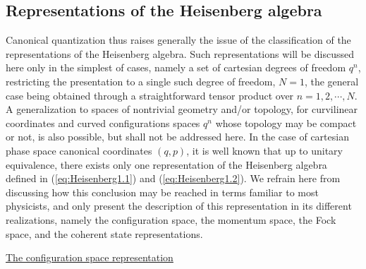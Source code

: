 \documentclass[a4paper,11pt]{article}
\begin{document}
\subsection{Representations of the Heisenberg algebra}
\label{Subsect2.4}

Canonical quantization thus raises generally the issue of the classification
of the representations of the Heisenberg algebra. Such representations
will be discussed here only in the simplest of cases, namely a set
of cartesian degrees of freedom $q^n$, restricting the presentation
to a single such degree of freedom, $N=1$, the general case being obtained
through a straightforward tensor pro\-duct over $n=1,2,\cdots,N$. 
A generalization to spaces of nontrivial geometry and/or topology,
for curvilinear coordinates and curved configurations spaces $q^n$ whose 
topology may be compact or not, is also possible, but shall not be addressed 
here.\cite{JG2,JG2bis} In the case of cartesian phase space canonical 
coordinates $(q,p)$,
it is well known that up to unitary equivalence, there exists only
one representation of the Heisenberg algebra defined in
(\ref{eq:Heisenberg1.1}) and (\ref{eq:Heisenberg1.2}). 
We refrain here from discussing how this conclusion may be reached
in terms familiar to most physicists,\cite{JG1,JG2,JG2bis} and only present 
the description of this representation in its different realizations,
namely the configuration space, the momentum space, the Fock space, 
and the coherent state representations.

\vspace{10pt}

\noindent\underline{The configuration space representation}

\vspace{10pt}
\end{document}
